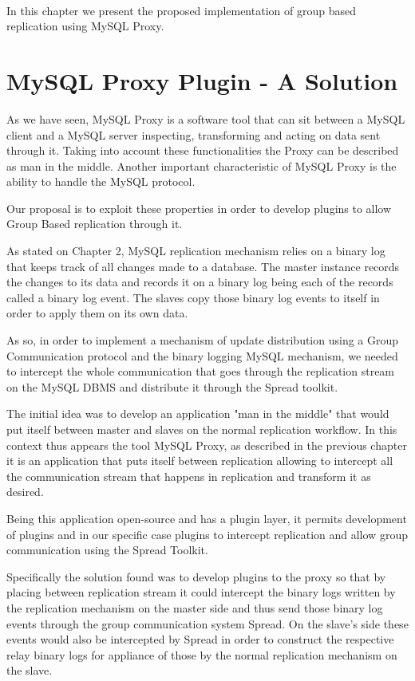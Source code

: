 \paragraph{}

In this chapter we present the proposed implementation of group based replication using MySQL Proxy.


\section{MySQL Proxy Plugin - A Solution}

As we have seen, MySQL Proxy is a software tool that can sit between a MySQL client and a MySQL server inspecting, transforming and acting on data sent through it. Taking into account these functionalities the Proxy can be described as man in the middle. Another important characteristic of MySQL Proxy is the ability to handle the MySQL protocol.

Our proposal is to exploit these properties in order to develop plugins to allow Group Based replication through it.  

As stated on Chapter 2, MySQL replication mechanism relies on a binary log that keeps track of all changes made to a database. The master instance records the changes to its data and records it on a binary log being each of the records called a binary log event. The slaves copy those binary log events to itself in order to apply them on its own data.

As so, in order to implement a mechanism of update distribution using a Group Communication protocol and the binary logging MySQL mechanism, we needed to intercept the whole communication that goes through the replication stream on the MySQL DBMS and distribute it through the Spread toolkit.

The initial idea was to develop an application "man in the middle" that would put itself between master and slaves on the normal replication workflow.
In this context thus appears the tool MySQL Proxy, as described in the previous chapter it is an application that puts itself between replication allowing to intercept all the communication stream that happens in replication and transform it as desired.

Being this application open-source and has a plugin layer, it permits development of plugins and in our specific case plugins to intercept replication and allow group communication using the Spread Toolkit.

Specifically the solution found was to develop plugins to the proxy so that by placing between replication stream it could intercept the binary logs written by the replication mechanism on the master side and thus send those binary log events through the group communication system Spread. On the slave's side these events would also be intercepted by Spread in order to construct the respective relay binary logs for appliance of those by the normal replication mechanism on the slave.

